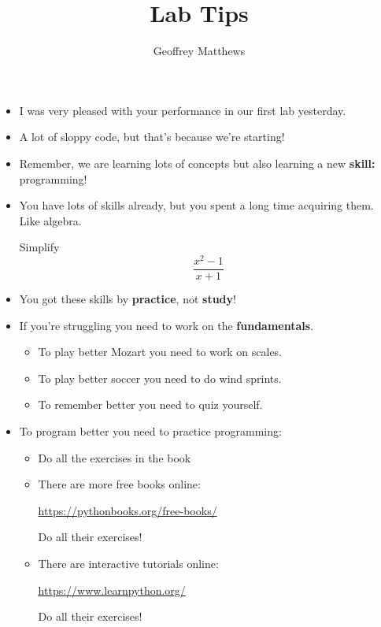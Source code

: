 \documentclass[12pt]{article}
\title{Lab Tips}
\author{Geoffrey Matthews}
\begin{document}
\maketitle
\begin{itemize}
\item I was very pleased with your performance in our first lab yesterday.
\item A lot of sloppy code, but that's because we're starting!
\item Remember, we are learning lots of concepts but also 
learning a new {\bf skill:} {\sc programming}!
\item You have lots of skills already, but you spent a long time
acquiring them.  Like algebra.

Simplify
\[ \frac{x^2-1}{x+1} \]

\item You got these skills by {\bf practice}, not {\bf study}!
\item If you're struggling you need to work on the {\bf fundamentals}.
\begin{itemize}
\item To play better Mozart you need to work on scales.
\item To play better soccer you need to do wind sprints.
\item To remember better you need to quiz yourself.
\end{itemize}
\item To program better you need to practice programming:
\begin{itemize}
\item Do all the exercises in the book
\item There are more free books online: 

\url{https://pythonbooks.org/free-books/}

Do all their exercises!
\item There are interactive tutorials online:

\url{https://www.learnpython.org/}

Do all their exercises!
\end{itemize}
\end{itemize}
\end{document}
